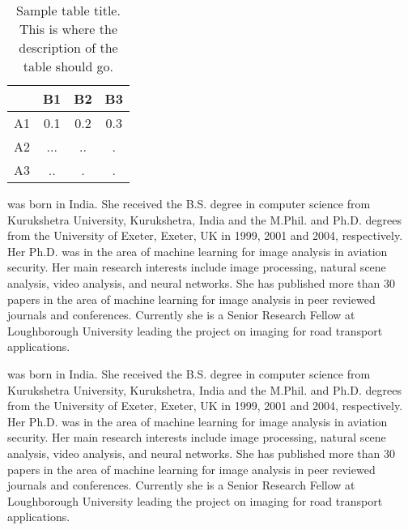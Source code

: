 \documentclass{classe_cn}                 %
\begin{document}
\begin{table}[h!]
\label{tag_tabela_01}
\caption{Sample table title. This is where the description of the table should go.}
  \begin{tabular}{cccc}
  \hline
       & B1   & B2   & B3   \\ \hline
   A1  & 0.1  & 0.2  & 0.3  \\
   A2  & ...  & ..   & .    \\
   A3  & ..   & .    & .    \\ \hline
  \end{tabular}
\end{table}


\vspace{1.0cm}
 was born in India. She received the B.S. 
degree in computer science from Kurukshetra University, Kurukshetra, 
India and the M.Phil. and Ph.D. degrees from the University of Exeter, 
Exeter, UK in 1999, 2001 and 2004, respectively. Her Ph.D. was in the 
area of machine learning for image analysis in aviation security. Her 
main research interests include image processing, natural scene analysis,
video analysis, and neural networks. She has published more than 30 papers
in the area of machine learning for image analysis in peer reviewed 
journals and conferences. Currently she is a Senior Research Fellow at
Loughborough University leading the project on imaging for road transport
applications.

 was born in India. She received the B.S. 
degree in computer science from Kurukshetra University, Kurukshetra, 
India and the M.Phil. and Ph.D. degrees from the University of Exeter, 
Exeter, UK in 1999, 2001 and 2004, respectively. Her Ph.D. was in the 
area of machine learning for image analysis in aviation security. Her 
main research interests include image processing, natural scene analysis,
video analysis, and neural networks. She has published more than 30 papers
in the area of machine learning for image analysis in peer reviewed 
journals and conferences. Currently she is a Senior Research Fellow at
Loughborough University leading the project on imaging for road transport
applications.   



\end{document}
